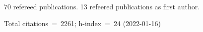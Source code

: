 70 refereed publications. 13 refeered publications as first author.

Total citations~=~2261; h-index~=~24 (2022-01-16)